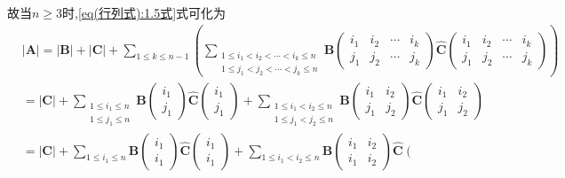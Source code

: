 \documentclass[../../main.tex]{subfiles}%
\begin{document}
\begin{solution}
\begin{enumerate}[(1)]
故当\(n\geqslant 3\)时,\eqref{eq(行列式):1.5式}式可化为
\begin{align*}
&|\boldsymbol{A}| = |\boldsymbol{B}| + |\boldsymbol{C}| + \sum_{1\leqslant k\leqslant n - 1}\left(\sum_{\substack{
1\leqslant i_1 < i_2 < \cdots < i_k\leqslant n\\
1\leqslant j_1 < j_2 < \cdots < j_k\leqslant n
}}\boldsymbol{B}\left(\begin{matrix}
i_1 & i_2 & \cdots & i_k\\
j_1 & j_2 & \cdots & j_k
\end{matrix}\right)\widehat{\boldsymbol{C}}\left(\begin{matrix}
i_1 & i_2 & \cdots & i_k\\
j_1 & j_2 & \cdots & j_k
\end{matrix}\right)\right) 
\\
&= |\boldsymbol{C}| + \sum_{\substack{
1\leqslant i_1\leqslant n\\
1\leqslant j_1\leqslant n
}}\boldsymbol{B}\left(\substack{
i_1\\
j_1
}\right)\widehat{\boldsymbol{C}}\left(\begin{array}{c}
i_1\\
j_1
\end{array}\right) + \sum_{\substack{
1\leqslant i_1 < i_2\leqslant n\\
1\leqslant j_1 < j_2\leqslant n
}}\boldsymbol{B}\left(\begin{matrix}
i_1 & i_2\\
j_1 & j_2
\end{matrix}\right)\widehat{\boldsymbol{C}}\left(\begin{matrix}
i_1 & i_2\\
j_1 & j_2
\end{matrix}\right)
\\
&= |\boldsymbol{C}| + \sum_{1\leqslant i_1\leqslant n}\boldsymbol{B}\left(\begin{array}{c}
i_1\\
i_1
\end{array}\right)\widehat{\boldsymbol{C}}\left(\begin{array}{c}
i_1\\
i_1
\end{array}\right) + \sum_{1\leqslant i_1 < i_2\leqslant n}\boldsymbol{B}\left(\begin{matrix}
i_1 & i_2\\
i_1 & i_2
\end{matrix}\right)\widehat{\boldsymbol{C}}\left(\begin{matrix}

\end{matrix}
\end{align*}
\end{enumerate}
\end{solution}
\end{document}

